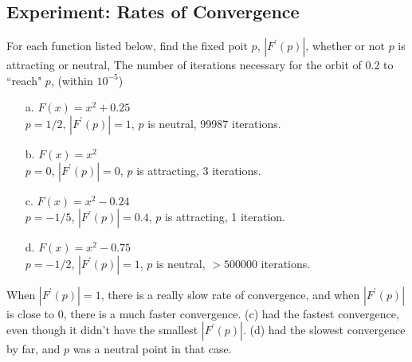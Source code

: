 \documentclass[12pt]{article}
\begin{document}
\subsection*{Experiment: Rates of Convergence}
For each function listed below, find the fixed poit $p$, $|F^{'}(p)|$, whether or not $p$ is attracting or neutral, The number of iterations necessary for the orbit of 0.2 to ``reach" $p$, (within $10^{-5}$)
\begin{itemize}
	\item[a.] $F(x) = x^2 + 0.25$ \\
		$p = 1/2$, $|F^{'}(p)| = 1$, $p$ is neutral, 99987 iterations.
	\item[b.] $F(x) = x^2$ \\
		$p = 0$, $|F^{'}(p)| = 0$, $p$ is attracting, 3 iterations. 
	\item[c.] $F(x) = x^2 - 0.24$ \\
		$p = -1/5$, $|F^{'}(p)| = 0.4$, $p$ is attracting, 1 iteration.
	\item[d.] $F(x) = x^2 - 0.75$ \\
		$p = -1/2$, $|F^{'}(p)| = 1$, $p$ is neutral, $> 500000$ iterations.
\end{itemize}
When $|F^{'}(p)| = 1$, there is a really slow rate of convergence, and when $|F^{'}(p)|$ is close to 0, there is a much faster convergence. (c) had the fastest convergence, even though it didn't have the smallest $|F^{'}(p)|$. (d) had the slowest convergence by far, and $p$ was a neutral point in that case. 
\end{document}
